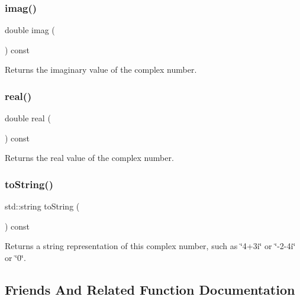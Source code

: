 \subsubsection{\texorpdfstring{imag()}{imag()}}
{\footnotesize\ttfamily double imag (\begin{DoxyParamCaption}{ }\end{DoxyParamCaption}) const}



Returns the imaginary value of the complex number. 

\mbox{\label{classComplex_a3a3f678878dde3a729f94dfefbdc4ef2}} 
\subsubsection{\texorpdfstring{real()}{real()}}
{\footnotesize\ttfamily double real (\begin{DoxyParamCaption}{ }\end{DoxyParamCaption}) const}



Returns the real value of the complex number. 

\mbox{\label{classComplex_a1fe5121d6528fdea3f243321b3fa3a49}} 
\subsubsection{\texorpdfstring{to\+String()}{toString()}}
{\footnotesize\ttfamily std\+::string to\+String (\begin{DoxyParamCaption}{ }\end{DoxyParamCaption}) const}



Returns a string representation of this complex number, such as \char`\"{}4+3i\char`\"{} or \char`\"{}-\/2-\/4i\char`\"{} or \char`\"{}0\char`\"{}. 



\subsection{Friends And Related Function Documentation}
\mbox{\label{classComplex_afcef21e5f4570416aa39a3412fb107c4}} 
